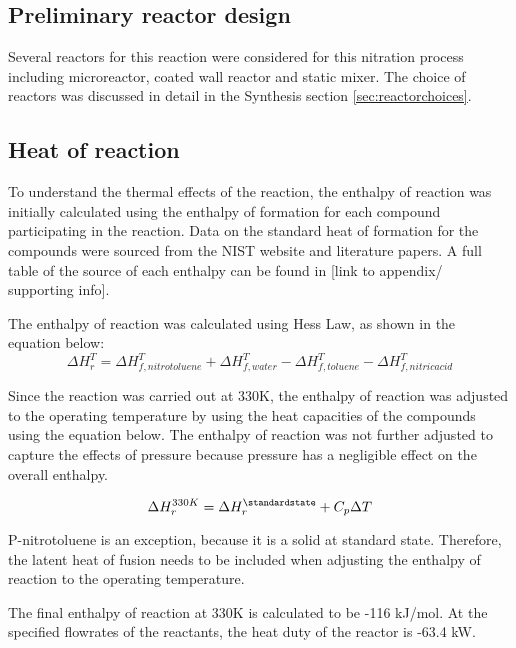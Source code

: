\subsection{Preliminary reactor design}
Several reactors for this reaction were considered for this nitration process including microreactor, coated wall reactor and static mixer. The choice of reactors was discussed in detail in the Synthesis section \ref{sec:reactorchoices}.

\subsection{Heat of reaction}
To understand the thermal effects of the reaction, the enthalpy of reaction was initially calculated using the enthalpy of formation for each compound participating in the reaction. Data on the standard heat of formation for the compounds were sourced from the NIST website and literature papers. A full table of the source of each enthalpy can be found in [link to appendix/ supporting info]. 

The enthalpy of reaction was calculated using Hess Law, as shown in the equation below:
\begin{equation}
  \Delta H_{r}^{T} = \Delta H_{f,nitrotoluene}^{T} + \Delta H_{f,water}^{T} - \Delta H_{f,toluene}^{T} - \Delta H_{f,nitric acid}^{T}
\end{equation}

Since the reaction was carried out at 330K, the enthalpy of reaction was adjusted to the operating temperature by using the heat capacities of the compounds using the equation below. The enthalpy of reaction was not further adjusted to capture the effects of pressure because pressure has a negligible effect on the overall enthalpy. 

\begin{equation}
  \Delta H_{r}^{330K} = \Delta H_{r}^{\standardstate} + C_p \Delta T
\end{equation}

P-nitrotoluene is an exception, because it is a solid at standard state. Therefore, the latent heat of fusion needs to be included when adjusting the enthalpy of reaction to the operating temperature. 

The final enthalpy of reaction at 330K is calculated to be -116 kJ/mol. At the specified flowrates of the reactants, the heat duty of the reactor is -63.4 kW.


